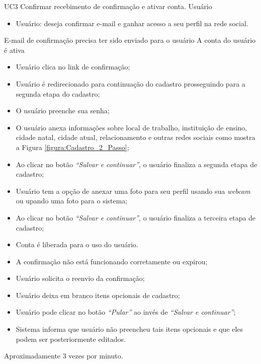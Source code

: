 \casoDeUso
{UC3}
{Confirmar recebimento de confirmação e ativar conta.}
{Usuário}
{
\begin{itemize}
	\item Usuário: deseja confirmar e-mail e ganhar acesso a seu perfil na rede social.
\end{itemize}

}
{E-mail de confirmação precisa ter sido enviado para o usuário}
{A conta do usuário é ativa}
{
\begin{itemize}
	\item Usuário clica no link de confirmação;
	\item Usuário é redirecionado para continuação do cadastro prosseguindo para a segunda etapa do cadastro;	
	\item O usuário preenche sua senha;
	\item O usuário anexa informações sobre local de trabalho, instituição de ensino, cidade natal, cidade atual, relacionamento e outras redes sociais como mostra a Figura \ref{figura:Cadastro_2_Passo};
	\item Ao clicar no botão \textit{“Salvar e continuar”}, o usuário finaliza a segunda etapa de cadastro;
	\item Usuário tem a opção de anexar uma foto para seu perfil usando sua \textit{webcam} ou upando uma foto para o sistema;
	\item Ao clicar no botão \textit{“Salvar e continuar”}, o usuário finaliza a terceira etapa de cadastro; 		
	\item Conta é liberada para o uso do usuário.		 
\end{itemize}
}
{
\begin{itemize}
	\item A confirmação não está funcionando corretamente ou expirou;
	\item Usuário solicita o reenvio da confirmação;
	
	\item Usuário deixa em branco itens opcionais de cadastro;
	\item Usuário pode clicar no botão \textit{“Pular”} ao invés de \textit{“Salvar e continuar”};
	
	\item Sistema informa que usuário não preencheu tais itens opcionais e que eles podem ser posteriormente editados.
	
\end{itemize}
}
{Aproximadamente 3 vezes por minuto.}
{

}

